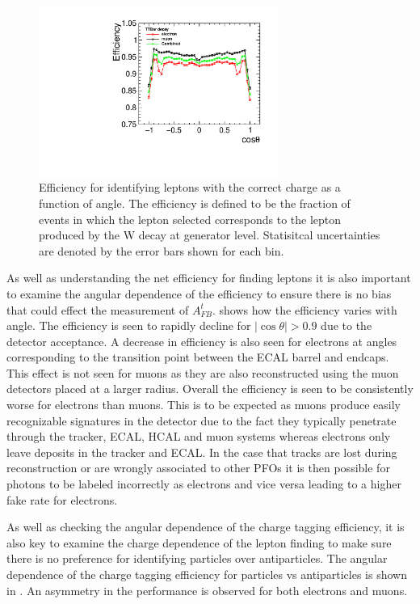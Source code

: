 \begin{figure}
  \centering
  \includegraphics[width=0.7\textwidth]{TopAnalysis/figures/NetEfficiencys.pdf}
  \caption[Efficiency for identifying leptons with the correct charge as a function of angle.]{Efficiency for identifying leptons with the correct charge as a function of angle. The efficiency is defined to be the fraction of events in which the lepton selected corresponds to the lepton produced by the W decay at generator level. Statisitcal uncertainties are denoted by the error bars shown for each bin.}
  \label{fig:netefficiency}
\end{figure}


As well as understanding the net efficiency for finding leptons it is also important to examine the angular dependence of the efficiency to ensure there is no bias that could effect the measurement of $A_{FB}^{t}$.  shows how the efficiency varies with angle. The efficiency is seen to rapidly decline for $|\cos\theta| > 0.9$ due to the detector acceptance. A decrease in efficiency is also seen for electrons at angles corresponding to the transition point between the ECAL barrel and endcaps. This effect is not seen for muons as they are also reconstructed using the muon detectors placed at a larger radius. Overall the efficiency is seen to be consistently worse for electrons than muons. This is to be expected as muons produce easily recognizable signatures in the detector due to the fact they typically penetrate through the tracker, ECAL, HCAL and muon systems whereas electrons only leave deposits in the tracker and ECAL. In the case that tracks are lost during reconstruction or are wrongly associated to other PFOs it is then possible for photons to be labeled incorrectly as electrons and vice versa leading to a higher fake rate for electrons.

As well as checking the angular dependence of the charge tagging efficiency, it is also key to examine the charge dependence of the lepton finding to make sure there is no preference for identifying particles over antiparticles. The angular dependence of the charge tagging efficiency for particles vs antiparticles is shown in . An asymmetry in the performance is observed for both electrons and muons.

